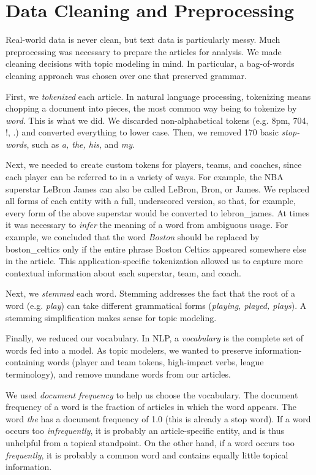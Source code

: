 \documentclass[11pt]{article}
\begin{document}
\section{Data Cleaning and Preprocessing}
Real-world data is never clean, but text data is particularly messy. Much preprocessing was necessary
to prepare the articles for analysis. We made cleaning decisions with topic modeling in mind. 
In particular, a bag-of-words cleaning approach was chosen over one that preserved grammar.

First, we \textit{tokenized} each article. In natural language processing, tokenizing means 
chopping a document into pieces, the most common way being to tokenize by \textit{word}. 
This is what we did.  We discarded non-alphabetical tokens (e.g. 8pm, 704, !, .) and 
converted everything to lower case.  Then, we removed 170 basic \textit{stop-words}, 
such as \textit{a, the, his}, and \textit{my}. 

Next, we needed to create custom tokens for players, teams, and coaches, since each player
can be referred to in a variety of ways. For example, the NBA superstar LeBron James can
also be called LeBron, Bron, or James.  We replaced all forms of each entity with a full,
underscored version, so that, for example, every form of the above superstar would be converted 
to lebron\_james.  At times it was necessary to \textit{infer} the meaning of a word from ambiguous
usage. For example, we concluded that the word \textit{Boston} should be replaced by boston\_celtics only if the entire phrase Boston Celtics appeared somewhere else in the article.  This application-specific tokenization allowed us to capture more contextual information about each superstar, team, and coach.

Next, we \textit{stemmed} each word. Stemming addresses the fact that the root of a word (e.g. \textit{play}) can take different grammatical forms (\textit{playing, played, plays}). A stemming simplification makes sense for topic modeling.

Finally, we reduced our vocabulary. In NLP, a \textit{vocabulary} is the complete set of words fed into a model.  As topic modelers, we wanted to preserve information-containing words (player and team tokens, high-impact verbs, league terminology), and remove mundane words from our articles.

We used \textit{document frequency} to help us choose the vocabulary. The document frequency of a word is the fraction of articles in which the word appears. The word \textit{the} has a document frequency of 1.0 (this is already a stop word). If a word occurs too \textit{infrequently}, it is probably an article-specific entity, and is thus unhelpful from a topical standpoint. On the other hand, if a word occurs too \textit{frequently}, it is probably a common word and  contains equally little topical information.
\end{document}
